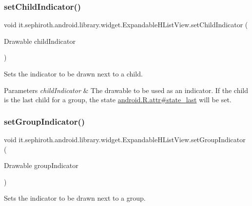 \subsubsection{\texorpdfstring{set\+Child\+Indicator()}{setChildIndicator()}}
{\footnotesize\ttfamily void it.\+sephiroth.\+android.\+library.\+widget.\+Expandable\+H\+List\+View.\+set\+Child\+Indicator (\begin{DoxyParamCaption}\item[{Drawable}]{child\+Indicator }\end{DoxyParamCaption})}

Sets the indicator to be drawn next to a child.


\begin{DoxyParams}{Parameters}
{\em child\+Indicator} & The drawable to be used as an indicator. If the child is the last child for a group, the state \hyperlink{}{android.\+R.\+attr\#state\+\_\+last} will be set. \\
\hline
\end{DoxyParams}
\mbox{\label{classit_1_1sephiroth_1_1android_1_1library_1_1widget_1_1_expandable_h_list_view_a59484a2d8d2aef838ee794b8bd448982}} 
\subsubsection{\texorpdfstring{set\+Group\+Indicator()}{setGroupIndicator()}}
{\footnotesize\ttfamily void it.\+sephiroth.\+android.\+library.\+widget.\+Expandable\+H\+List\+View.\+set\+Group\+Indicator (\begin{DoxyParamCaption}\item[{Drawable}]{group\+Indicator }\end{DoxyParamCaption})}

Sets the indicator to be drawn next to a group.


